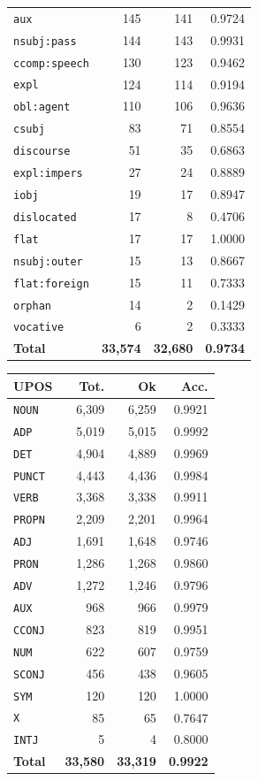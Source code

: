 \begin{table}[ht]
\begin{minipage}[t]{0.55\linewidth}
\begin{tabular}{lrrr}
\texttt{aux} & 145 & 141 & 0.9724 \\
\texttt{nsubj\!:\!pass} & 144 & 143 & 0.9931 \\
\texttt{ccomp\!:\!speech} & 130 & 123 & 0.9462 \\
\texttt{expl} & 124 & 114 & 0.9194 \\
\texttt{obl\!:\!agent} & 110 & 106 & 0.9636 \\
\texttt{csubj} & 83 & 71 & 0.8554 \\
\texttt{discourse} & 51 & 35 & 0.6863 \\
\texttt{expl\!:\!impers} & 27 & 24 & 0.8889 \\
\texttt{iobj} & 19 & 17 & 0.8947 \\
\texttt{dislocated} & 17 & 8 & 0.4706 \\
\texttt{flat} & 17 & 17 & 1.0000 \\
\texttt{nsubj\!:\!outer} & 15 & 13 & 0.8667 \\
\texttt{flat\!:\!foreign} & 15 & 11 & 0.7333 \\
\texttt{orphan} & 14 & 2 & 0.1429 \\
\texttt{vocative} & 6 & 2 & 0.3333 \\
\midrule
\textbf{Total} & \textbf{33,574} & \textbf{32,680} & \textbf{0.9734} \\
\bottomrule
\end{tabular}
\end{minipage}
\hfill
\begin{minipage}[t]{0.42\linewidth}
\centering\scriptsize
\begin{tabular}{lrrr}
\toprule
\textbf{UPOS} & \textbf{Tot.} & \textbf{Ok} & \textbf{Acc.} \\
\midrule
\texttt{NOUN} & 6,309 & 6,259 & 0.9921 \\
\texttt{ADP} & 5,019 & 5,015 & 0.9992 \\
\texttt{DET} & 4,904 & 4,889 & 0.9969 \\
\texttt{PUNCT} & 4,443 & 4,436 & 0.9984 \\
\texttt{VERB} & 3,368 & 3,338 & 0.9911 \\
\texttt{PROPN} & 2,209 & 2,201 & 0.9964 \\
\texttt{ADJ} & 1,691 & 1,648 & 0.9746 \\
\texttt{PRON} & 1,286 & 1,268 & 0.9860 \\
\texttt{ADV} & 1,272 & 1,246 & 0.9796 \\
\texttt{AUX} & 968 & 966 & 0.9979 \\
\texttt{CCONJ} & 823 & 819 & 0.9951 \\
\texttt{NUM} & 622 & 607 & 0.9759 \\
\texttt{SCONJ} & 456 & 438 & 0.9605 \\
\texttt{SYM} & 120 & 120 & 1.0000 \\
\texttt{X} & 85 & 65 & 0.7647 \\
\texttt{INTJ} & 5 & 4 & 0.8000 \\
\midrule
\textbf{Total} & \textbf{33,580} & \textbf{33,319} & \textbf{0.9922} \\
\bottomrule
\end{tabular}
\end{minipage}
\end{table}
